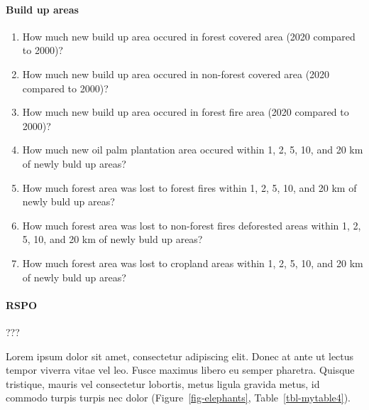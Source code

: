 \documentclass[
]{article}
\let\oldparagraph\paragraph
\renewcommand{\paragraph}[1]{\oldparagraph{#1}\mbox{}}
\providecommand{\tightlist}{%
  \setlength{\itemsep}{0pt}\setlength{\parskip}{0pt}}\usepackage{longtable,booktabs,array}
\begin{document}
\hypertarget{build-up-areas}{%
\paragraph{Build up areas}\label{build-up-areas}}

\begin{enumerate}
\def\labelenumi{\arabic{enumi}.}
\tightlist
\item
  How much new build up area occured in forest covered area (2020
  compared to 2000)?
\item
  How much new build up area occured in non-forest covered area (2020
  compared to 2000)?
\item
  How much new build up area occured in forest fire area (2020 compared
  to 2000)?
\item
  How much new oil palm plantation area occured within 1, 2, 5, 10, and
  20 km of newly buld up areas?
\item
  How much forest area was lost to forest fires within 1, 2, 5, 10, and
  20 km of newly buld up areas?
\item
  How much forest area was lost to non-forest fires deforested areas
  within 1, 2, 5, 10, and 20 km of newly buld up areas?
\item
  How much forest area was lost to cropland areas within 1, 2, 5, 10,
  and 20 km of newly buld up areas?
\end{enumerate}

\hypertarget{rspo-1}{%
\paragraph{RSPO}\label{rspo-1}}

???

Lorem ipsum dolor sit amet, consectetur adipiscing elit. Donec at ante
ut lectus tempor viverra vitae vel leo. Fusce maximus libero eu semper
pharetra. Quisque tristique, mauris vel consectetur lobortis, metus
ligula gravida metus, id commodo turpis turpis nec dolor
(Figure~\ref{fig-elephants}, Table~\ref{tbl-mytable4}).
\end{document}
